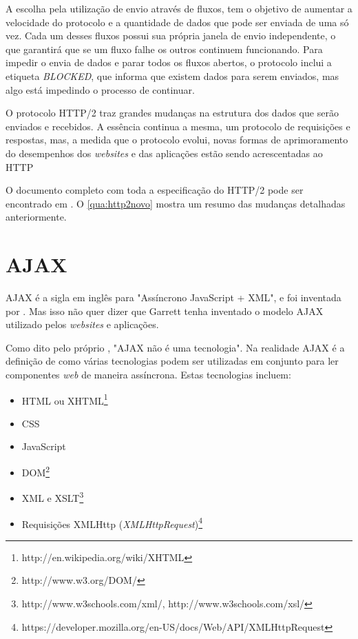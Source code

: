 A escolha pela utilização de envio através de fluxos, tem o objetivo de aumentar a velocidade do protocolo e a quantidade de dados que pode ser enviada de uma só vez. Cada um desses fluxos possui sua própria janela de envio independente, o que garantirá que se um fluxo falhe os outros continuem funcionando. Para impedir o envia de dados e parar todos os fluxos abertos, o protocolo inclui a etiqueta \textit{BLOCKED}, que informa que existem dados para serem enviados, mas algo está impedindo o processo de continuar.

O protocolo HTTP/2 traz grandes mudanças na estrutura dos dados que serão enviados e recebidos. A essência continua a mesma, um protocolo de requisições e respostas, mas, a medida que o protocolo evolui, novas formas de aprimoramento do desempenhos dos \textit{websites} e das aplicações estão sendo acrescentadas ao HTTP

O documento completo com toda a especificação do HTTP/2 pode ser encontrado em \cite{HTTP2Spec}. O \autoref{qua:http2novo} mostra um resumo das mudanças detalhadas anteriormente.



\newpage
\section{AJAX}
\label{sec:ajax}
AJAX é a sigla em inglês para "Assíncrono JavaScript + XML", e foi inventada por . Mas isso não quer dizer que Garrett tenha inventado o modelo AJAX utilizado pelos \textit{websites} e aplicações.

Como dito pelo próprio , "AJAX não é uma tecnologia". Na realidade AJAX é a definição de como várias tecnologias podem ser utilizadas em conjunto para ler componentes \textit{web} de maneira assíncrona. Estas tecnologias incluem:
	\begin{itemize}
		\item HTML ou XHTML\footnote{http://en.wikipedia.org/wiki/XHTML}
		\item CSS
		\item JavaScript
		\item DOM\footnote{http://www.w3.org/DOM/}
		\item XML e XSLT\footnote{http://www.w3schools.com/xml/, http://www.w3schools.com/xsl/}
		\item Requisições XMLHttp (\textit{XMLHttpRequest})\footnote{https://developer.mozilla.org/en-US/docs/Web/API/XMLHttpRequest}
	\end{itemize}

